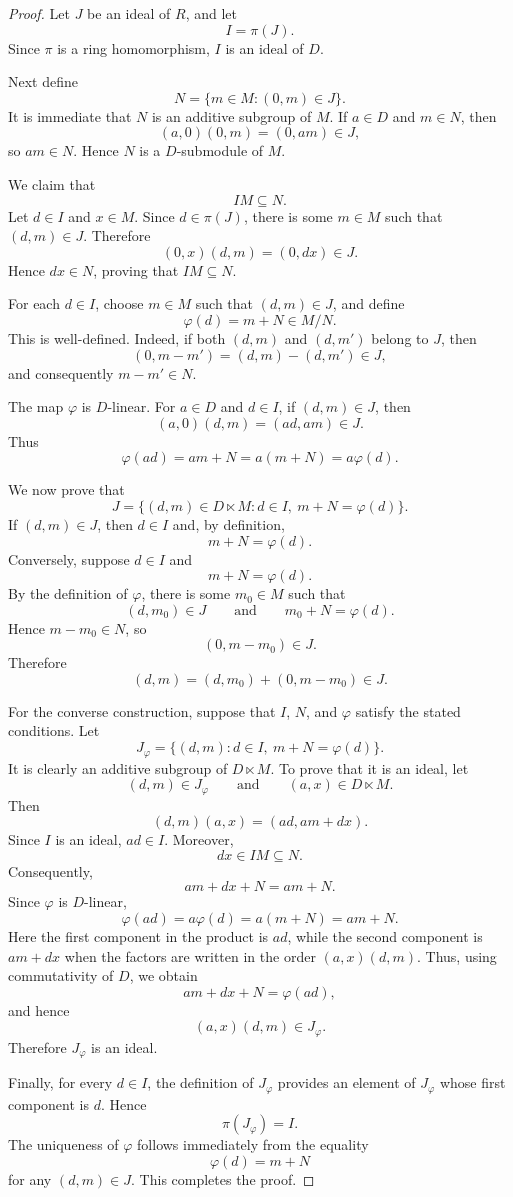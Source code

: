 \documentclass[10pt,a4paper]{amsart}
\begin{document}
	\begin{proof}
		Let $J$ be an ideal of $R$, and let
		\[
		I=\pi(J).
		\]
		Since $\pi$ is a ring homomorphism, $I$ is an ideal of $D$.
		
		Next define
		\[
		N=\{m\in M:(0,m)\in J\}.
		\]
		It is immediate that $N$ is an additive subgroup of $M$. If
		$a\in D$ and $m\in N$, then
		\[
		(a,0)(0,m)=(0,am)\in J,
		\]
		so $am\in N$. Hence $N$ is a $D$-submodule of $M$.
		
		We claim that
		\[
		IM\subseteq N.
		\]
		Let $d\in I$ and $x\in M$. Since $d\in\pi(J)$, there is some
		$m\in M$ such that $(d,m)\in J$. Therefore
		\[
		(0,x)(d,m)=(0,dx)\in J.
		\]
		Hence $dx\in N$, proving that $IM\subseteq N$.
		
		For each $d\in I$, choose $m\in M$ such that $(d,m)\in J$, and
		define
		\[
		\varphi(d)=m+N\in M/N.
		\]
		This is well-defined. Indeed, if both $(d,m)$ and $(d,m')$ belong to
		$J$, then
		\[
		(0,m-m')=(d,m)-(d,m')\in J,
		\]
		and consequently $m-m'\in N$.
		
		The map $\varphi$ is $D$-linear. For $a\in D$ and $d\in I$, if
		$(d,m)\in J$, then
		\[
		(a,0)(d,m)=(ad,am)\in J.
		\]
		Thus
		\[
		\varphi(ad)=am+N=a(m+N)=a\varphi(d).
		\]
		
		We now prove that
		\[
		J
		=
		\{(d,m)\in D\ltimes M:
		d\in I,\ m+N=\varphi(d)\}.
		\]
		If $(d,m)\in J$, then $d\in I$ and, by definition,
		\[
		m+N=\varphi(d).
		\]
		Conversely, suppose $d\in I$ and
		\[
		m+N=\varphi(d).
		\]
		By the definition of $\varphi$, there is some $m_0\in M$ such that
		\[
		(d,m_0)\in J
		\qquad\text{and}\qquad
		m_0+N=\varphi(d).
		\]
		Hence $m-m_0\in N$, so
		\[
		(0,m-m_0)\in J.
		\]
		Therefore
		\[
		(d,m)=(d,m_0)+(0,m-m_0)\in J.
		\]
		
		For the converse construction, suppose that $I$, $N$, and $\varphi$
		satisfy the stated conditions. Let
		\[
		J_\varphi
		=
		\{(d,m):d\in I,\ m+N=\varphi(d)\}.
		\]
		It is clearly an additive subgroup of $D\ltimes M$. To prove that it
		is an ideal, let
		\[
		(d,m)\in J_\varphi
		\qquad\text{and}\qquad
		(a,x)\in D\ltimes M.
		\]
		Then
		\[
		(d,m)(a,x)=(ad,am+dx).
		\]
		Since $I$ is an ideal, $ad\in I$. Moreover,
		\[
		dx\in IM\subseteq N.
		\]
		Consequently,
		\[
		am+dx+N=am+N.
		\]
		Since $\varphi$ is $D$-linear,
		\[
		\varphi(ad)=a\varphi(d)=a(m+N)=am+N.
		\]
		Here the first component in the product is $ad$, while the second
		component is $am+dx$ when the factors are written in the order
		$(a,x)(d,m)$. Thus, using commutativity of $D$, we obtain
		\[
		am+dx+N=\varphi(ad),
		\]
		and hence
		\[
		(a,x)(d,m)\in J_\varphi.
		\]
		Therefore $J_\varphi$ is an ideal.
		
		Finally, for every $d\in I$, the definition of $J_\varphi$ provides
		an element of $J_\varphi$ whose first component is $d$. Hence
		\[
		\pi(J_\varphi)=I.
		\]
		The uniqueness of $\varphi$ follows immediately from the equality
		\[
		\varphi(d)=m+N
		\]
		for any $(d,m)\in J$. This completes the proof.
	\end{proof}
\end{document}
